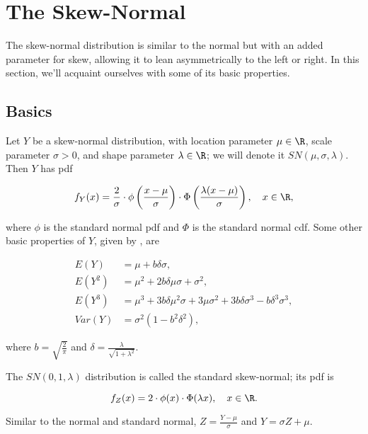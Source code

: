 \section{The Skew-Normal}

The skew-normal distribution is similar to the normal but with an added
parameter for skew, allowing it to lean asymmetrically to the left or right. In
this section, we'll acquaint ourselves with some of its basic properties.

\subsection{Basics}

Let $Y$ be a skew-normal distribution, with location parameter $\mu \in \R$,
scale parameter $\sigma > 0$, and shape parameter $\lambda \in \R$; we will
denote it $SN(\mu, \sigma, \lambda)$. Then $Y$ has pdf

\begin{equation} \label{eq:sn-pdf}
  f_Y(x) = \frac2\sigma \cdot \phi \left( \frac{x-\mu}{\sigma} \right) \cdot \Phi \left( \frac{\lambda(x-\mu)}{\sigma} \right), \quad x \in \R,
\end{equation}

where $\phi$ is the standard normal pdf and $\Phi$ is the standard normal cdf.
Some other basic properties of $Y$, given by \citet{pewsey}, are

\begin{align}
  E(Y) &= \mu + b \delta \sigma, \nonumber \\
  E(Y^2) &= \mu^2 + 2b \delta \mu \sigma + \sigma^2, \label{eq:sn-basic-properties} \\
  E(Y^3) &= \mu^3 + 3 b \delta \mu^2 \sigma + 3 \mu \sigma^2 + 3 b \delta \sigma^3 - b \delta^3 \sigma^3, \nonumber \\
  Var(Y) &= \sigma^2 (1 - b^2 \delta^2), \nonumber
\end{align}

where $b = \sqrt{\frac{2}{\pi}}$ and $\delta = \frac{\lambda}{\sqrt{1 +
\lambda^2}}$.

The $SN(0,1,\lambda)$ distribution is called the standard skew-normal; its pdf
is

\begin{equation} \label{eq:standard-sn-pdf}
  f_Z(x) = 2 \cdot \phi(x) \cdot \Phi (\lambda x), \quad x \in \R.
\end{equation}

Similar to the normal and standard normal, $Z = \frac{Y - \mu}{\sigma}$ and $Y
= \sigma Z + \mu$.


